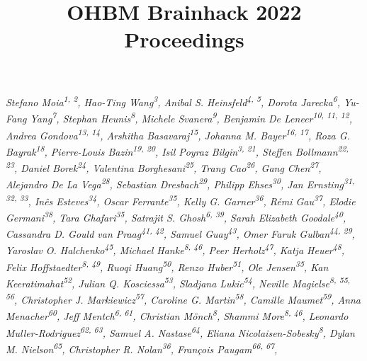 \documentclass[10pt,a4paper,twocolumns]{proc}
\title{OHBM Brainhack 2022 Proceedings}
\newcommand{\authors}[1]{\emph{\footnotesize #1} \\}
\begin{document}
\maketitle

\authors{Stefano Moia\textsuperscript{1, 2}, %
Hao-Ting Wang\textsuperscript{3}, %
Anibal S. Heinsfeld\textsuperscript{4, 5}, %
Dorota Jarecka\textsuperscript{6}, %
Yu-Fang Yang\textsuperscript{7}, %
Stephan Heunis\textsuperscript{8}, %
Michele Svanera\textsuperscript{9}, %
Benjamin De Leneer\textsuperscript{10, 11, 12}, %
Andrea Gondova\textsuperscript{13, 14}, %
Arshitha Basavaraj\textsuperscript{15}, %
Johanna M. Bayer\textsuperscript{16, 17}, %
Roza G. Bayrak\textsuperscript{18}, %
Pierre-Louis Bazin\textsuperscript{19, 20}, %
Isil Poyraz Bilgin\textsuperscript{3, 21}, %
Steffen Bollmann\textsuperscript{22, 23}, %
Daniel Borek\textsuperscript{24}, %
Valentina Borghesani\textsuperscript{25}, %
Trang Cao\textsuperscript{26}, %
Gang Chen\textsuperscript{27}, %
Alejandro De La Vega\textsuperscript{28}, %
Sebastian Dresbach\textsuperscript{29}, %
Philipp Ehses\textsuperscript{30}, %
Jan Ernsting\textsuperscript{31, 32, 33}, %
Inês Esteves\textsuperscript{34}, %
Oscar Ferrante\textsuperscript{35}, %
Kelly G. Garner\textsuperscript{36}, %
Rémi Gau\textsuperscript{37}, %
Elodie Germani\textsuperscript{38}, %
Tara Ghafari\textsuperscript{35}, %
Satrajit S. Ghosh\textsuperscript{6, 39}, %
Sarah Elizabeth Goodale\textsuperscript{40}, %
Cassandra D. Gould van Praag\textsuperscript{41, 42}, %
Samuel Guay\textsuperscript{43}, %
Omer Faruk Gulban\textsuperscript{44, 29}, %
Yaroslav O. Halchenko\textsuperscript{45}, %
Michael Hanke\textsuperscript{8, 46}, %
Peer Herholz\textsuperscript{47}, %
Katja Heuer\textsuperscript{48}, %
Felix Hoffstaedter\textsuperscript{8, 49}, %
Ruoqi Huang\textsuperscript{50}, %
Renzo Huber\textsuperscript{51}, %
Ole Jensen\textsuperscript{35}, %
Kan Keeratimahat\textsuperscript{52}, %
Julian Q. Kosciessa\textsuperscript{53}, %
Sladjana Lukic\textsuperscript{54}, %
Neville Magielse\textsuperscript{8, 55, 56}, %
Christopher J. Markiewicz\textsuperscript{57}, %
Caroline G. Martin\textsuperscript{58}, %
Camille Maumet\textsuperscript{59}, %
Anna Menacher\textsuperscript{60}, %
Jeff Mentch\textsuperscript{6, 61}, %
Christian Mönch\textsuperscript{8}, %
Shammi More\textsuperscript{8, 46}, %
Leonardo Muller-Rodriguez\textsuperscript{62, 63}, %
Samuel A. Nastase\textsuperscript{64}, %
Eliana Nicolaisen-Sobesky\textsuperscript{8}, %
Dylan M. Nielson\textsuperscript{65}, %
Christopher R. Nolan\textsuperscript{36}, %
François Paugam\textsuperscript{66, 67}, %
}
\end{document}
